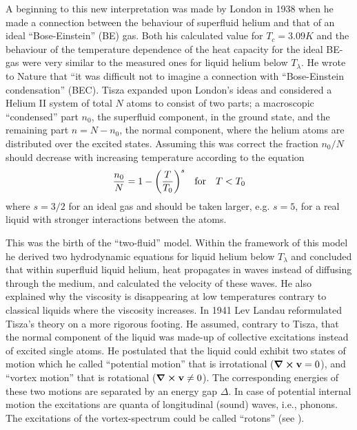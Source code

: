 		A beginning to this new interpretation was made by London\citep{London1938} in 1938 when he made a connection between the behaviour of superfluid helium and that of an ideal ``Bose-Einstein'' (BE) gas. Both his calculated value for $T_c=3.09\unit{K}$ and the behaviour of the temperature dependence of the heat capacity for the ideal BE-gas were very similar to the measured ones for liquid helium below $T_\lambda$. He wrote to Nature that ``it was difficult not to imagine a connection with ``Bose-Einstein condensation'' (BEC). Tisza expanded upon London's ideas\citep{Tisza1938} and considered a Helium II system of total $N$ atoms to consist of two parts; a macroscopic ``condensed'' part $n_0$, the superfluid component, in the ground state, and the remaining part $n=N-n_0$, the normal component, where the helium atoms are distributed over the excited states. Assuming this was correct the fraction $n_0/N$ should decrease with increasing temperature according to the equation
		\begin{align}
			\frac{n_0}{N} = 1-\qty(\frac{T}{T_0})^s \quad \text{for} \quad T<T_0
		\end{align}
		where $s=3/2$ for an ideal gas and should be taken larger, e.g. $s=5$, for a real liquid with stronger interactions between the atoms.
				
		This was the birth of the ``two-fluid'' model. Within the framework of this model he derived two hydrodynamic equations for liquid helium below $T_\lambda$ and concluded that within superfluid liquid helium, heat propagates in waves instead of diffusing through the medium, and calculated the velocity of these waves. He also explained why the viscosity is disappearing at low temperatures contrary to classical liquids where the viscosity increases\citep{Tisza1938-1,Tisza1938-2,Tisza1940-1,Tisza1940-2}. In 1941 Lev Landau reformulated Tisza's theory on a more rigorous footing\citep{Landau1941,Landau1949}. He assumed, contrary to Tisza, that the normal component of the liquid was made-up of collective excitations instead of excited single atoms. He postulated that the liquid could exhibit two states of motion which he called ``potential motion'' that is irrotational ($\curl{\bm{\mathrm{v}}}=0$), and ``vortex motion'' that is rotational ($\curl{\bm{\mathrm{v}}} \neq 0$). The corresponding energies of these two motions are separated by an energy gap $\Delta$. In case of potential internal motion  the excitations are quanta of longitudinal (sound) waves, i.e., phonons. The excitations of the vortex-spectrum could be called ``rotons'' (see ).

